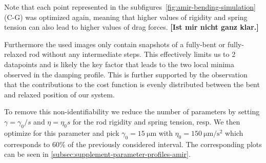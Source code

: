 \documentclass[10pt,letterpaper]{article}
\begin{document}
Note that each point represented in the subfigures~\ref{fig:amir-bending-simulation} (C-G) was
optimized again, meaning that higher values of rigidity and spring tension can also lead to higher
values of drag forces.
\textbf{[Ist mir nicht ganz klar.]}

Furthermore the used images only contain snapshots of a fully-bent or fully-relaxed rod without any
intermediate steps.
This effectively limits us to 2 datapoints and is likely the key factor that leads to the two local
minima observed in the damping profile.
This is further supported by the observation that the contributions to the cost function is evenly
distributed between the bent and relaxed position of our system.

To remove this non-identifiability we reduce the number of parameters by setting $\gamma=\gamma_0/s$
and $\eta=\eta_0 s$ for the rod rigidity and spring tension, resp.
We then optimize for this parameter and pick $\gamma_0=\SI{15}{\micro\metre}$ with
$\eta_0=\SI{150}{\micro\metre\per\second\squared}$ which corresponds to $60\%$ of the previously considered
interval.
The corresponding plots can be seen in \ref{subsec:supplement-parameter-profiles-amir}.
\end{document}
